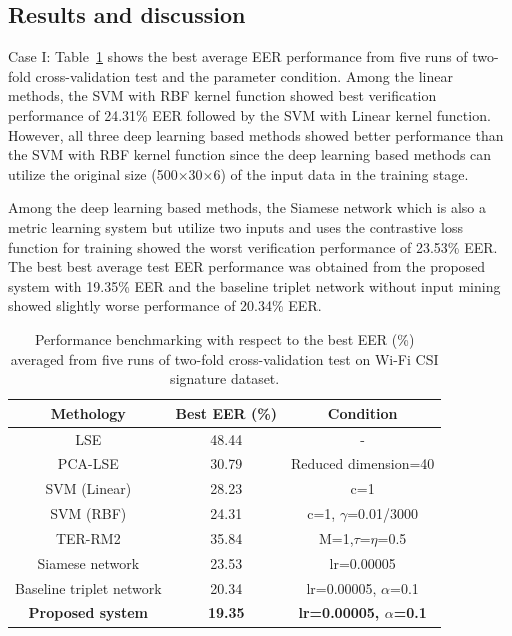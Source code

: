 \documentclass[runningheads]{llncs}
\begin{document}
\subsection{Results and discussion}

Case I: Table~\ref{tab3} shows the best average EER performance from five runs of two-fold cross-validation test and the parameter condition. Among the linear methods, the SVM with RBF kernel function showed best verification performance of 24.31\% EER followed by the SVM with Linear kernel function. However, all three deep learning based methods showed better performance than the SVM with RBF kernel function since the deep learning based methods can utilize the original size (500$\times$30$\times$6) of the input data in the training stage.

Among the deep learning based methods, the Siamese network which is also a metric learning system but utilize two inputs and uses the contrastive loss function for training showed the worst verification performance of 23.53\% EER. The best best average test EER performance was obtained from the proposed system with 19.35\% EER and the baseline triplet network without input mining showed slightly worse performance of 20.34\% EER.

\begin{table}[!h]
    \caption{Performance benchmarking with respect to the best EER (\%) averaged from five runs of two-fold cross-validation test on Wi-Fi CSI signature dataset.}\label{tab3}
    \centering
    \begin{tabular}{|c|c|c|}
    \hline
    Methology   &   Best EER (\%) &   Condition   \\  \hline
    LSE &   48.44   &  - \\ 
    PCA-LSE    &   30.79   &  Reduced dimension=40    \\
    SVM (Linear) &   28.23   &   c=1 \\
    SVM (RBF)    &   24.31   &   c=1, $\gamma$=0.01/3000 \\
    TER-RM2 &   35.84   &  M=1,$\tau$=$\eta$=0.5   \\     \hline
    Siamese network  &   23.53   &   lr=0.00005  \\
    Baseline triplet network &   20.34   &   lr=0.00005, $\alpha$=0.1  \\
    \textbf{Proposed system} &   \textbf{19.35}   &  \textbf{lr=0.00005, $\alpha$=0.1}  \\
     \hline
    \end{tabular}
\end{table}
\end{document}
